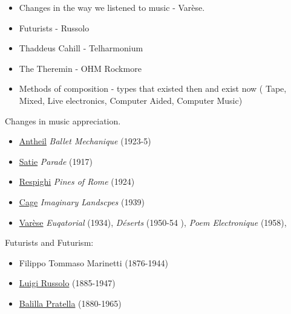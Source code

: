 \begin{itemize}
\item Changes in the way we listened to music - Var\`ese.
\item Futurists - Russolo
\item Thaddeus Cahill - Telharmonium
\item The Theremin - OHM Rockmore 
\item Methods of composition - types that existed then and exist now (
Tape,
Mixed,
Live electronics,
Computer Aided,
Computer Music)
\end{itemize}

Changes in music appreciation.

\begin{itemize}
\item \href{http://www.grovemusic.com/shared/views/article.html?from=search&session_search_id=1013431856&session_name=f64e02b451f7a922&hitnum=1&section=music.00997&start=1&query=antheil&search_subview=search_subject}{Antheil} \textit{Ballet Mechanique} (1923-5)
\item \href{http://www.grovemusic.com/shared/views/article.html?from=search&session_search_id=1013432477&session_name=f64e02b451f7a922&hitnum=1&section=music.40105&start=1&query=satie&search_subview=search_subject}{Satie} \textit{Parade} (1917)
\item \href{http://www.grovemusic.com/shared/views/article.html?section=music.47335}{Respighi} \textit{Pines of Rome} (1924)
\item \href{http://www.grovemusic.com/shared/views/article.html?section=music.49908}{Cage} \textit{Imaginary Landscpes} (1939)
\item \href{http://www.grovemusic.com/shared/views/article.html?section=music.29042}{Var\`ese} \textit{Euqatorial} (1934), \textit{D\'eserts} (1950-54 ), \textit{Poem Electronique} (1958),
\end{itemize}


Futurists and Futurism:
\begin{itemize}
\item Filippo Tommaso Marinetti (1876-1944)
\item \href{http://www.grovemusic.com/shared/views/article.html?section=music.24174}{Luigi Russolo} (1885-1947)
\item \href{http://www.grovemusic.com/shared/views/article.html?from=search&session_search_id=1013432510&session_name=f64e02b451f7a922&hitnum=4&section=music.22259&start=1&query=marinetti&search_subview=search_subject}{Balilla Pratella} (1880-1965)
\end{itemize}

